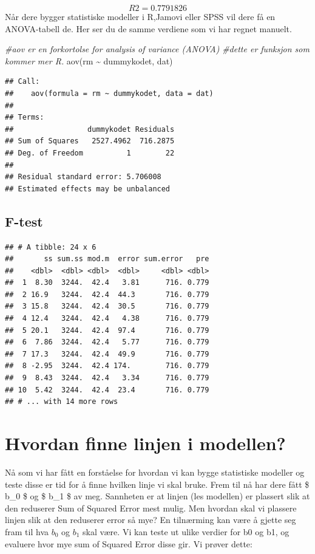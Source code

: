 \documentclass[
]{book}
\newenvironment{Shaded}{\begin{snugshade}}{\end{snugshade}}
\newcommand{\CommentTok}[1]{\textcolor[rgb]{0.56,0.35,0.01}{\textit{#1}}}
\newcommand{\FunctionTok}[1]{\textcolor[rgb]{0.00,0.00,0.00}{#1}}
\newcommand{\NormalTok}[1]{#1}
\newcommand{\SpecialCharTok}[1]{\textcolor[rgb]{0.00,0.00,0.00}{#1}}
\begin{document}
\[
R2 = 0.7791826
\]
Når dere bygger statistiske modeller i R,Jamovi eller SPSS vil dere få en ANOVA-tabell de. Her ser du de samme verdiene som vi har regnet manuelt.

\begin{Shaded}
\begin{Highlighting}[]
\CommentTok{\#aov er en forkortolse for analysis of variance (ANOVA)}
\CommentTok{\#dette er funksjon som kommer mer R.}
\FunctionTok{aov}\NormalTok{(rm }\SpecialCharTok{\textasciitilde{}}\NormalTok{ dummykodet, dat)}
\end{Highlighting}
\end{Shaded}

\begin{verbatim}
## Call:
##    aov(formula = rm ~ dummykodet, data = dat)
## 
## Terms:
##                 dummykodet Residuals
## Sum of Squares   2527.4962  716.2875
## Deg. of Freedom          1        22
## 
## Residual standard error: 5.706008
## Estimated effects may be unbalanced
\end{verbatim}

\hypertarget{f-test}{%
\section{F-test}\label{f-test}}

\begin{verbatim}
## # A tibble: 24 x 6
##       ss sum.ss mod.m  error sum.error   pre
##    <dbl>  <dbl> <dbl>  <dbl>     <dbl> <dbl>
##  1  8.30  3244.  42.4   3.81      716. 0.779
##  2 16.9   3244.  42.4  44.3       716. 0.779
##  3 15.8   3244.  42.4  30.5       716. 0.779
##  4 12.4   3244.  42.4   4.38      716. 0.779
##  5 20.1   3244.  42.4  97.4       716. 0.779
##  6  7.86  3244.  42.4   5.77      716. 0.779
##  7 17.3   3244.  42.4  49.9       716. 0.779
##  8 -2.95  3244.  42.4 174.        716. 0.779
##  9  8.43  3244.  42.4   3.34      716. 0.779
## 10  5.42  3244.  42.4  23.4       716. 0.779
## # ... with 14 more rows
\end{verbatim}

\hypertarget{hvordan-finne-linjen-i-modellen}{%
\chapter{Hvordan finne linjen i modellen?}\label{hvordan-finne-linjen-i-modellen}}

Nå som vi har fått en forståelse for hvordan vi kan bygge statistiske modeller og teste disse er tid for å finne hvilken linje vi skal bruke. Frem til nå har dere fått \$ b\_0 \$ og \$ b\_1 \$ av meg. Sannheten er at linjen (les modellen) er plassert slik at den reduserer Sum of Squared Error mest mulig. Men hvordan skal vi plassere linjen slik at den reduserer error så mye? En tilnærming kan være å gjette seg fram til hva \(b_0\) og \(b_1\) skal være. Vi kan teste ut ulike verdier for b0 og b1, og evaluere hvor mye sum of Squared Error disse gir. Vi prøver dette:
\end{document}
